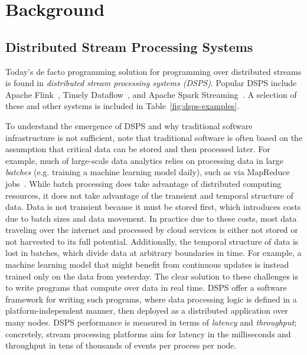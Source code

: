 \section{Background}
\label{sec:rw}

\subsection{Distributed Stream Processing Systems}

Today's de facto programming solution for programming over
distributed streams
is found in \emph{distributed stream processing systems (DSPS)}.
Popular DSPS include
Apache Flink~\cite{Flink,Flink2015},
Timely Dataflow~\cite{Timely,Naiad2013},
and Apache Spark Streaming~\cite{SparkStreaming,Spark2013}.
A selection of these and other systems is included in Table~\ref{fig:dsps-examples}.

To understand the emergence of DSPS and why traditional software infrastructure
is not sufficient, note that traditional software
is often based on the assumption that
critical data can be stored and then processed later.
For example,
much of large-scale data analytics relies on processing data in large
\emph{batches} (e.g. training a machine learning model daily),
such as via MapReduce jobs~\cite{dean2008mapreduce}.
While batch processing
does take advantage of distributed computing resources,
it does not take advantage of the transient and temporal structure of data.
Data is not transient because it must be stored first,
which introduces costs due to batch sizes and data movement.
In practice due to these costs, most data traveling over the internet
and processed by cloud services is either not stored or not harvested to its full potential.
Additionally, the temporal structure of data is lost in batches, which divide
data at arbitrary boundaries in time.
For example, a machine learning model that might benefit from continuous updates is instead trained only on the data from yesterday.
The clear solution to these challenges is to write programs that compute over data in real time.
DSPS offer a software framework for writing such programs, where data processing logic is defined in a platform-independent manner,
then deployed as a distributed application over many nodes.
DSPS performance is measured in terms of \emph{latency} and \emph{throughput};
concretely, stream processing platforms aim for latency in the milliseconds and throughput in tens of thousands of events per process per node.


